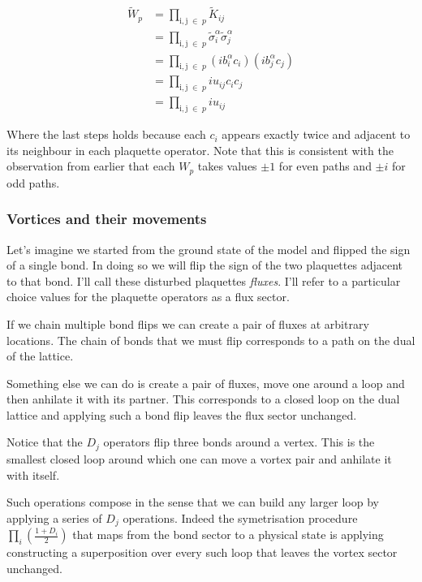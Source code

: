 \[\begin{aligned}
\tilde{W}_p &= \prod_{\mathrm{i,j}\; \in\; p} \tilde{K}_{ij}\\
            &= \prod_{\mathrm{i,j}\; \in\; p} \tilde{\sigma}_i^\alpha \tilde{\sigma}_j^\alpha\\
            &= \prod_{\mathrm{i,j}\; \in\; p} (ib^\alpha_i c_i)(ib^\alpha_j c_j)\\
            &= \prod_{\mathrm{i,j}\; \in\; p} i u_{ij} c_i c_j\\
            &= \prod_{\mathrm{i,j}\; \in\; p} i u_{ij}
\end{aligned}\]

Where the last steps holds because each \(c_i\) appears exactly twice
and adjacent to its neighbour in each plaquette operator. Note that this
is consistent with the observation from earlier that each \(W_p\) takes
values \(\pm 1\) for even paths and \(\pm i\) for odd paths.

\hypertarget{vortices-and-their-movements}{%
\subsubsection{Vortices and their
movements}\label{vortices-and-their-movements}}

Let's imagine we started from the ground state of the model and flipped
the sign of a single bond. In doing so we will flip the sign of the two
plaquettes adjacent to that bond. I'll call these disturbed plaquettes
\emph{fluxes}. I'll refer to a particular choice values for the
plaquette operators as a flux sector.

If we chain multiple bond flips we can create a pair of fluxes at
arbitrary locations. The chain of bonds that we must flip corresponds to
a path on the dual of the lattice.

Something else we can do is create a pair of fluxes, move one around a
loop and then anhilate it with its partner. This corresponds to a closed
loop on the dual lattice and applying such a bond flip leaves the flux
sector unchanged.

Notice that the \(D_j\) operators flip three bonds around a vertex. This
is the smallest closed loop around which one can move a vortex pair and
anhilate it with itself.

Such operations compose in the sense that we can build any larger loop
by applying a series of \(D_j\) operations. Indeed the symetrisation
procedure \(\prod_i \left( \frac{1 + D_i}{2}\right)\) that maps from the
bond sector to a physical state is applying constructing a superposition
over every such loop that leaves the vortex sector unchanged.

